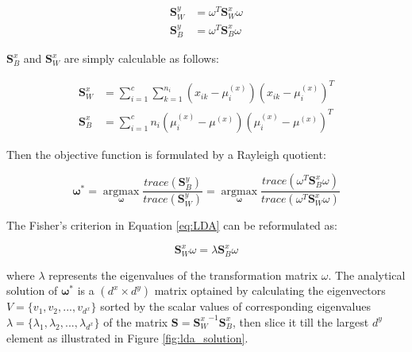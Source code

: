         \begin{align}
            \boldsymbol{S}_W^y &= \omega^T\boldsymbol{S}_W^x\omega\\
            \boldsymbol{S}_B^y &= \omega^T\boldsymbol{S}_B^x\omega
        \end{align}

        $\boldsymbol{S}_B^x$ and $\boldsymbol{S}_W^x$ are simply calculable as follows:

        \begin{align}
            \boldsymbol{S}_W^x &= \sum_{i=1}^{c}\sum_{k=1}^{n_{i}}(x_{ik}-\mu_i^{(x)})(x_{ik}-\mu_i^{(x)})^T \label{eq:LDA_Sw_x}\\
            \boldsymbol{S}_B^x &= \sum_{i=1}^{c}n_i(\mu_i^{(x)} - \mu^{(x)})(\mu_i^{(x)} - \mu^{(x)})^T \label{eq:LDA_Sb_x}
        \end{align}

        Then the objective function is formulated by a Rayleigh quotient:

        \begin{equation}
            \boldsymbol{\omega}^* = \operatorname*{argmax}_{\boldsymbol{\omega}}\frac{trace(\boldsymbol{S}_B^y)}{trace(\boldsymbol{S}_W^y)} = \operatorname*{argmax}_{\boldsymbol{\omega}}\frac{trace(\omega^T\boldsymbol{S}_B^x\omega)}{trace(\omega^T\boldsymbol{S}_W^x\omega)}
            \label{eq:LDA}
        \end{equation}

        The Fisher's criterion in Equation \eqref{eq:LDA} can be reformulated as:

        \begin{equation}
            \boldsymbol{S}_W^x\omega = \lambda\boldsymbol{S}_B^x\omega
        \end{equation}

        where $\lambda$ represents the eigenvalues of the transformation matrix $\omega$. The analytical solution of $\boldsymbol{\omega}^*$ is a $(d^x \times d^y)$ matrix optained by calculating the eigenvectors $V = \{v_1,v_2,...,v_{d^x}\}$ sorted by the scalar values of corresponding eigenvalues $\lambda = \{\lambda_1,\lambda_2,...,\lambda_{d^x}\}$ of the matrix $\boldsymbol{S} = {\boldsymbol{S}_W^x}^{-1}\boldsymbol{S}_B^x$, then slice it till the largest $d^y$ element as illustrated in Figure \ref{fig:lda_solution}.

